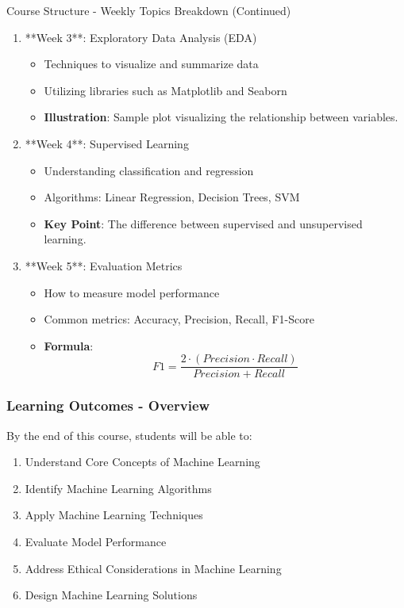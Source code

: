 \documentclass[aspectratio=169]{beamer}
\begin{document}
\begin{frame}[fragile]{Course Structure - Weekly Topics Breakdown (Continued)}
    \begin{enumerate}[resume]
        \item **Week 3**: Exploratory Data Analysis (EDA)
        \begin{itemize}
            \item Techniques to visualize and summarize data
            \item Utilizing libraries such as Matplotlib and Seaborn
            \item \textbf{Illustration}: Sample plot visualizing the relationship between variables.
        \end{itemize}
        \item **Week 4**: Supervised Learning
        \begin{itemize}
            \item Understanding classification and regression
            \item Algorithms: Linear Regression, Decision Trees, SVM
            \item \textbf{Key Point}: The difference between supervised and unsupervised learning.
        \end{itemize}
        \item **Week 5**: Evaluation Metrics
        \begin{itemize}
            \item How to measure model performance
            \item Common metrics: Accuracy, Precision, Recall, F1-Score
            \item \textbf{Formula}:
            \begin{equation}
                F1 = \frac{2 \cdot (Precision \cdot Recall)}{Precision + Recall}
            \end{equation}
        \end{itemize}
    \end{enumerate}
\end{frame}

\begin{frame}[fragile]
    \frametitle{Learning Outcomes - Overview}
    By the end of this course, students will be able to:
    \begin{enumerate}
        \item Understand Core Concepts of Machine Learning
        \item Identify Machine Learning Algorithms
        \item Apply Machine Learning Techniques
        \item Evaluate Model Performance
        \item Address Ethical Considerations in Machine Learning
        \item Design Machine Learning Solutions
    \end{enumerate}
\end{frame}
\end{document}

